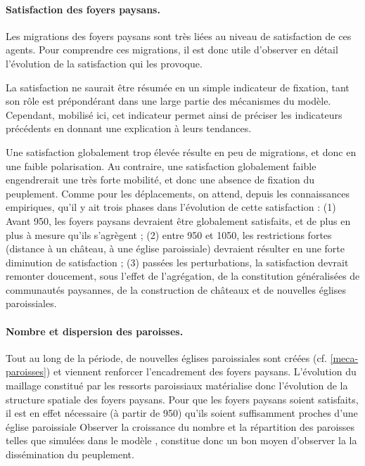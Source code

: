 \paragraph{Satisfaction des foyers paysans.}

Les migrations des foyers paysans sont très liées au niveau de satisfaction de ces agents.
Pour comprendre ces migrations, il est donc utile d'observer en détail l'évolution de la satisfaction qui les provoque.

La satisfaction ne saurait être résumée en un simple indicateur de fixation, tant son rôle est prépondérant dans une large partie des mécanismes du modèle.
Cependant, mobilisé ici, cet indicateur permet ainsi de préciser les indicateurs précédents en donnant une explication à leurs tendances.

Une satisfaction globalement trop élevée résulte en peu de migrations, et donc en une faible polarisation.
Au contraire, une satisfaction globalement faible engendrerait une très forte mobilité, et donc une absence de fixation du peuplement.
Comme pour les déplacements, on attend, depuis les connaissances empiriques, qu'il y ait trois phases dans l'évolution de cette satisfaction :
(1) Avant 950, les foyers paysans devraient être globalement satisfaits, et de plus en plus à mesure qu'ils s'agrègent ;
(2) entre 950 et 1050, les restrictions fortes (distance à un château, à une église paroissiale) devraient résulter en une forte diminution de satisfaction ;
(3) passées les perturbations, la satisfaction devrait remonter doucement, sous l'effet de l'agrégation, de la constitution généralisées de communautés paysannes, de la construction de châteaux et de nouvelles églises paroissiales.

\paragraph{Nombre et dispersion des paroisses.}

Tout au long de la période, de nouvelles églises paroissiales sont créées (cf. \cref{meca-paroisses}) et viennent renforcer l'encadrement des foyers paysans.
L'évolution du maillage constitué par les ressorts paroissiaux matérialise donc l'évolution de la structure spatiale des foyers paysans.
Pour que les foyers paysans soient satisfaits, il est en effet nécessaire (à partir de 950) qu'ils soient suffisamment proches d'une église paroissiale
Observer la croissance du nombre et la répartition des paroisses telles que simulées dans le modèle \simfeodal{}, constitue donc un bon moyen d'observer la la dissémination du peuplement.

